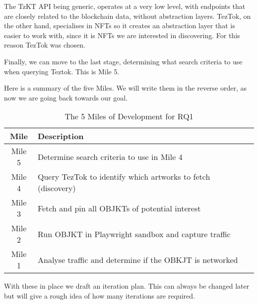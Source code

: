 
The TzKT API being generic, operates at a very low level, with endpoints that are closely related to the blockchain data, without abstraction layers.
TezTok, on the other hand, specialises in NFTs so it creates an abstraction layer that is easier to work with, since it is NFTs we are interested in discovering. For this reason TezTok was chosen.

Finally, we can move to the last stage, determining what search criteria to use when querying Teztok. This is Mile 5.

Here is a summary of the five Miles. We will write them in the reverse order, as now we are going back towards our goal.

\vspace{0.5cm}

\begin{table}[h]
\footnotesize
\centering
\begin{tabular}{|c|p{10cm}|}
\hline
\textbf{Mile} & \textbf{Description} \\ \hline
Mile 5 & Determine search criteria to use in Mile 4 \\ \hline
Mile 4 & Query TezTok to identify which artworks to fetch (discovery) \\ \hline
Mile 3 & Fetch and pin all OBJKTs of potential interest \\ \hline
Mile 2 & Run OBJKT in Playwright sandbox and capture traffic \\ \hline
Mile 1 & Analyse traffic and determine if the OBKJT is networked \\ \hline
\end{tabular}
\caption{The 5 Miles of Development for RQ1}
\end{table}

With these in place we draft an iteration plan. This can always be changed later but will give a rough idea of how many iterations are required.


